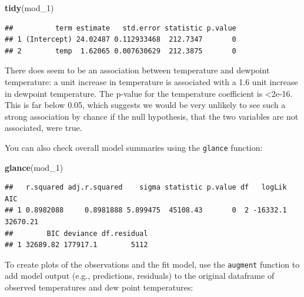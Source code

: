 \documentclass[]{book}
\makeatletter
\newenvironment{Shaded}{\begin{snugshade}}{\end{snugshade}}
\newcommand{\KeywordTok}[1]{\textcolor[rgb]{0.13,0.29,0.53}{\textbf{#1}}}
\newcommand{\DecValTok}[1]{\textcolor[rgb]{0.00,0.00,0.81}{#1}}
\newcommand{\StringTok}[1]{\textcolor[rgb]{0.31,0.60,0.02}{#1}}
\newcommand{\OperatorTok}[1]{\textcolor[rgb]{0.81,0.36,0.00}{\textbf{#1}}}
\newcommand{\NormalTok}[1]{#1}
\newenvironment{kframe}{%
\medskip{}
\setlength{\fboxsep}{.8em}
 \def\at@end@of@kframe{}%
 \ifinner\ifhmode%
  \def\at@end@of@kframe{\end{minipage}}%
  \begin{minipage}{\columnwidth}%
 \fi\fi%
 \def\FrameCommand##1{\hskip\@totalleftmargin \hskip-\fboxsep
 \colorbox{shadecolor}{##1}\hskip-\fboxsep
     \hskip-\linewidth \hskip-\@totalleftmargin \hskip\columnwidth}%
 \MakeFramed {\advance\hsize-\width
   \@totalleftmargin\z@ \linewidth\hsize
   \@setminipage}}%
 {\par\unskip\endMakeFramed%
 \at@end@of@kframe}
\renewenvironment{Shaded}{\begin{kframe}}{\end{kframe}}
\theoremstyle{definition}
\theoremstyle{definition}
\theoremstyle{definition}
\theoremstyle{remark}
\makeatother
\begin{document}
\begin{Shaded}
\begin{Highlighting}[]
\KeywordTok{tidy}\NormalTok{(mod_}\DecValTok{1}\NormalTok{)}
\end{Highlighting}
\end{Shaded}

\begin{verbatim}
##          term estimate   std.error statistic p.value
## 1 (Intercept) 24.02487 0.112933468  212.7347       0
## 2        temp  1.62065 0.007630629  212.3875       0
\end{verbatim}

There does seem to be an association between temperature and dewpoint
temperature: a unit increase in temperature is associated with a 1.6
unit increase in dewpoint temperature. The p-value for the temperature
coefficient is \textless{}2e-16. This is far below 0.05, which suggests
we would be very unlikely to see such a strong association by chance if
the null hypothesis, that the two variables are not associated, were
true.

You can also check overall model summaries using the \texttt{glance}
function:

\begin{Shaded}
\begin{Highlighting}[]
\KeywordTok{glance}\NormalTok{(mod_}\DecValTok{1}\NormalTok{)}
\end{Highlighting}
\end{Shaded}

\begin{verbatim}
##   r.squared adj.r.squared    sigma statistic p.value df   logLik      AIC
## 1 0.8982088     0.8981888 5.899475  45108.43       0  2 -16332.1 32670.21
##        BIC deviance df.residual
## 1 32689.82 177917.1        5112
\end{verbatim}

To create plots of the observations and the fit model, use the
\texttt{augment} function to add model output (e.g., predictions,
residuals) to the original dataframe of observed temperatures and dew
point temperatures:

\begin{Shaded}
\end{Shaded}
\end{document}
